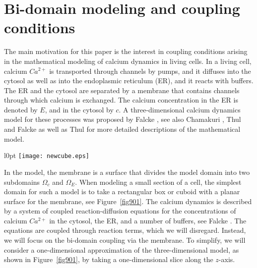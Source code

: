 %
%
\section{Bi-domain modeling and coupling conditions}%
\label{sec:bi}
%
%

The main motivation for this paper is the interest in coupling conditions arising 
in the mathematical modeling of calcium dynamics in living cells.
In a living cell, calcium $Ca^{2+}$ is transported through channels by pumps, and it diffuses into the cytosol
as well as into the endoplasmic reticulum (ER), and it reacts with buffers. The ER and the cytosol are
separated by a membrane that contains channels through which calcium is exchanged.
The calcium concentration in the ER is denoted by $E$, and in the cytosol by $c$. 
A three-dimensional calcium dynamics model for these processes was proposed by Falcke \cite{l8}, see also 
Chamakuri \cite{l9}, Thul and Falcke \cite{l11} as well as Thul \cite{l10} for more detailed descriptions 
of the mathematical model. 


\begin{wrapfigure}{l}{0pt}
\texttt{[image: newcube.eps]}
\centering
\caption{Bi-domain cubic volume distribution of ER and cytosolic domains, modification of a figure from \cite{l9}.}
\label{fig901}
\end{wrapfigure}

In the model, the membrane is a surface that divides
the model domain into two subdomains $\Omega_c$ and $\Omega_E$. When modeling a small section of a cell,
the simplest domain for such a model
is to take a rectangular box or cuboid with a planar surface for the membrane, see Figure~\ref{fig901}.
The calcium dynamics is described
by a system of coupled reaction-diffusion equations for the concentrations of calcium $Ca^{2+}$ in the cytosol, the ER,
 and a number of buffers, see Falcke \cite{l8}. The equations are coupled through reaction terms, which we will disregard. Instead, we will focus on the bi-domain coupling via the membrane. To simplify, we will consider a one-dimensional approximation of the three-dimensional model, as shown in Figure~\ref{fig901}, by taking a one-dimensional slice along the $z$-axis.

%
%
